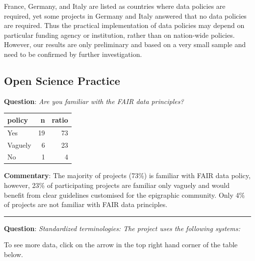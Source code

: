 \documentclass[
  10pt,
]{article}
\begin{document}
France, Germany, and Italy are listed as countries where data policies
are required, yet some projects in Germany and Italy answered that no
data policies are required. Thus the practical implementation of data
policies may depend on particular funding agency or institution, rather
than on nation-wide policies. However, our results are only preliminary
and based on a very small sample and need to be confirmed by further
investigation.

\hypertarget{open-science-practice-1}{%
\subsection{Open Science Practice}\label{open-science-practice-1}}

\textbf{Question}: \emph{Are you familiar with the FAIR data
principles?}

\begin{longtable}[]{@{}lrr@{}}
\toprule
policy & n & ratio \\
\midrule
\endhead
Yes & 19 & 73 \\
Vaguely & 6 & 23 \\
No & 1 & 4 \\
\bottomrule
\end{longtable}

\textbf{Commentary}: The majority of projects (73\%) is familiar with
FAIR data policy, however, 23\% of participating projects are familiar
only vaguely and would benefit from clear guidelines customised for the
epigraphic community. Only 4\% of projects are not familiar with FAIR
data principles.

\begin{center}\rule{0.5\linewidth}{0.5pt}\end{center}

\textbf{Question}: \emph{Standardized terminologies: The project uses
the following systems:}

To see more data, click on the arrow in the top right hand corner of the
table below.
\end{document}
